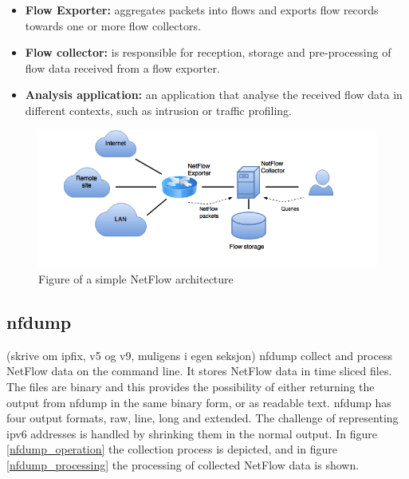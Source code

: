 \begin{itemize}
\item \textbf{Flow Exporter:} aggregates packets into flows and exports flow records towards one or more flow collectors. 

\item \textbf{Flow collector:} is responsible for reception, storage and pre-processing of flow data received from a flow exporter.

\item \textbf{Analysis application:} an application that analyse the received flow data in different contexts, such as intrusion or traffic profiling.
\end{itemize}

\begin{figure}[h!]
\includegraphics[scale=0.5]{netflow_arch}
\caption{Figure of a simple NetFlow architecture}
\end{figure}

\subsection{nfdump}
\todo(skrive om ipfix, v5 og v9, muligens i egen seksjon)
nfdump collect and process NetFlow data on the command line. It stores NetFlow data in time sliced files. The files are binary and this provides the possibility of either returning the output from nfdump in the same binary form, or as readable text. nfdump has four output formats, raw, line, long and extended. 
The challenge of representing \gls{ipv6} addresses is handled by shrinking them in the normal output. 
In figure \ref{nfdump_operation} the collection process is depicted, and in figure \ref{nfdump_processing} the processing of collected NetFlow data is shown.\citep{nfdump}

